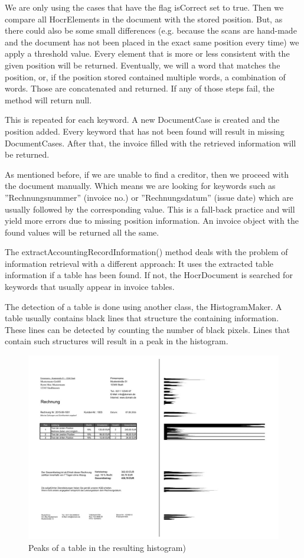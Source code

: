 We are only using the cases that have the flag isCorrect set to true. Then we compare all HocrElements in the document with the stored position. But, as there could also be some small differences (e.g. because the scans are hand-made and the document has not been placed in the exact same position every time) we apply a threshold value. Every element that is more or less consistent with the given position will be returned. Eventually, we will a word that matches the position, or, if the position stored contained multiple words, a combination of words. Those are concatenated and returned. If any of those steps fail, the method will return null.

This is repeated for each keyword. A new DocumentCase is created and the position added. Every keyword that has not been found will result in missing DocumentCases. After that, the invoice filled with the retrieved information will be returned.

As mentioned before, if we are unable to find a creditor, then we proceed with the document manually. Which means we are looking for keywords such as ''Rechnungsnummer'' (invoice no.) or ''Rechnungsdatum'' (issue date) which are usually followed by the corresponding value. This is a fall-back practice and will yield more errors due to missing position information. An invoice object with the found values will be returned all the same.

The extractAccountingRecordInformation() method deals with the problem of information retrieval with a different approach: It uses the extracted table information if a table has been found. If not, the HocrDocument is searched for keywords that usually appear in invoice tables.

The detection of a table is done using another class, the HistogramMaker. A table usually contains black lines that structure the containing information. These lines can be detected by counting the number of black pixels. Lines that contain such structures will result in a peak in the histogram. 

\begin{figure}[h]
\centering
\includegraphics[scale=0.6]{Images/OCR/histogram.jpg}
\caption{Peaks of a table in the resulting histogram)  \label{histogramImage}}
\end{figure}

